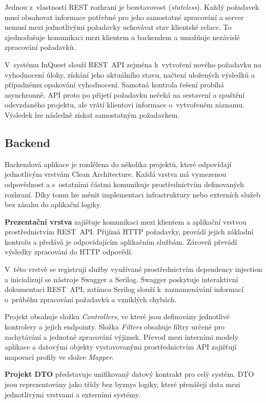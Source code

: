 \documentclass[
  biblatex,
  figures,
  tables,
  glossaries,
  index
]{kidiplom}
\begin{document}
Jednou z~vlastností REST rozhraní je bezstavovost (\textit{stateless}). Každý požadavek musí obsahovat informace potřebné pro jeho samostatné zpracování a server nemusí mezi jednotlivými požadavky uchovávat stav klientské relace. To zjednodušuje komunikaci mezi klientem a backendem a umožňuje nezávislé zpracování požadavků.

V~systému InQuest slouží REST~API zejména k~vytvoření nového požadavku na vyhodnocení úlohy, získání jeho aktuálního stavu, načtení uložených výsledků a případnému opakování vyhodnocení. Samotná kontrola řešení probíhá asynchronně. API proto po přijetí požadavku nečeká na sestavení a spuštění odevzdaného projektu, ale vrátí klientovi informace o~vytvořeném záznamu. Výsledek lze následně získat samostatným požadavkem.


\subsection{Backend}
\label{subsec:backend}
Backendová aplikace je rozdělena do několika projektů, které odpovídají jednotlivým vrstvám Clean Architecture. Každá vrstva má vymezenou odpovědnost a s~ostatními částmi komunikuje prostřednictvím definovaných rozhraní. Díky tomu lze měnit implementaci infrastruktury nebo externích služeb bez zásahu do aplikační logiky.

\textbf{Prezentační vrstva} zajišťuje komunikaci mezi klientem a aplikační vrstvou prostřednictvím REST~API. Přijímá HTTP požadavky, provádí jejich základní kontrolu a předává je odpovídajícím aplikačním službám. Zároveň převádí výsledky zpracování do HTTP odpovědí.

V~této vrstvě se registrují služby využívané prostřednictvím dependency injection a inicializují se nástroje Swagger a Serilog. Swagger poskytuje interaktivní dokumentaci REST~API, zatímco Serilog slouží k~zaznamenávání informací o~průběhu zpracování požadavků a vzniklých chybách.

Projekt obsahuje složku \textit{Controllers}, ve které jsou definovány jednotlivé kontrolery a jejich endpointy. Složka \textit{Filters} obsahuje filtry určené pro zachytávání a jednotné zpracování výjimek. Převod mezi interními modely aplikace a datovými objekty vystavovanými prostřednictvím API zajišťují mapovací profily ve složce \textit{Mapper}.

\textbf{Projekt DTO} představuje unifikovaný datový kontrakt pro celý systém. DTO jsou reprezentovány jako třídy bez byznys logiky, které přenášejí data mezi jednotlivými vrstvami a externími systémy.
\end{document}
